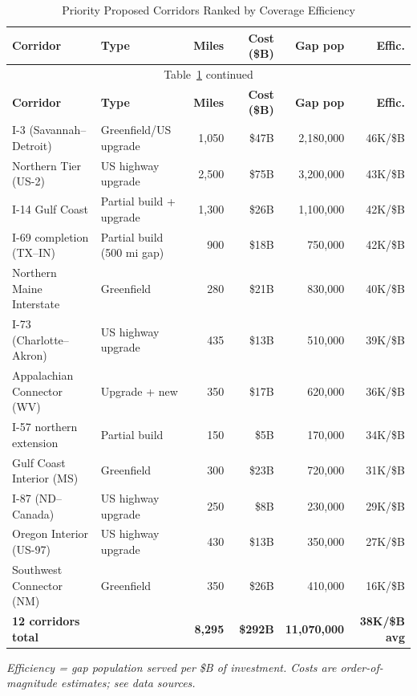 \begin{longtable}{p{3.5cm}p{2.5cm}rrrr}
\caption{Priority Proposed Corridors Ranked by Coverage Efficiency} \label{tab:corridors} \\
\toprule
\textbf{Corridor} & \textbf{Type} & \textbf{Miles} & \textbf{Cost (\$B)} & \textbf{Gap pop} & \textbf{Effic.} \\
\midrule
\endfirsthead
\multicolumn{6}{c}{Table~\ref{tab:corridors} continued} \\
\toprule
\textbf{Corridor} & \textbf{Type} & \textbf{Miles} & \textbf{Cost (\$B)} & \textbf{Gap pop} & \textbf{Effic.} \\
\midrule
\endhead
\bottomrule
\endfoot

I-3 (Savannah–Detroit) & Greenfield/US upgrade & 1,050 & \$47B & 2,180,000 & 46K/\$B \\
Northern Tier (US-2) & US highway upgrade & 2,500 & \$75B & 3,200,000 & 43K/\$B \\
I-14 Gulf Coast & Partial build + upgrade & 1,300 & \$26B & 1,100,000 & 42K/\$B \\
I-69 completion (TX–IN) & Partial build (500 mi gap) & 900 & \$18B & 750,000 & 42K/\$B \\
Northern Maine Interstate & Greenfield & 280 & \$21B & 830,000 & 40K/\$B \\
I-73 (Charlotte–Akron) & US highway upgrade & 435 & \$13B & 510,000 & 39K/\$B \\
Appalachian Connector (WV) & Upgrade + new & 350 & \$17B & 620,000 & 36K/\$B \\
I-57 northern extension & Partial build & 150 & \$5B & 170,000 & 34K/\$B \\
Gulf Coast Interior (MS) & Greenfield & 300 & \$23B & 720,000 & 31K/\$B \\
I-87 (ND–Canada) & US highway upgrade & 250 & \$8B & 230,000 & 29K/\$B \\
Oregon Interior (US-97) & US highway upgrade & 430 & \$13B & 350,000 & 27K/\$B \\
Southwest Connector (NM) & Greenfield & 350 & \$26B & 410,000 & 16K/\$B \\
\textbf{12 corridors total} & & \textbf{8,295} & \textbf{\$292B} & \textbf{11,070,000} & \textbf{38K/\$B avg} \\

\end{longtable}

\textit{Efficiency = gap population served per \$B of investment. Costs are order-of-magnitude estimates; see data sources.}

